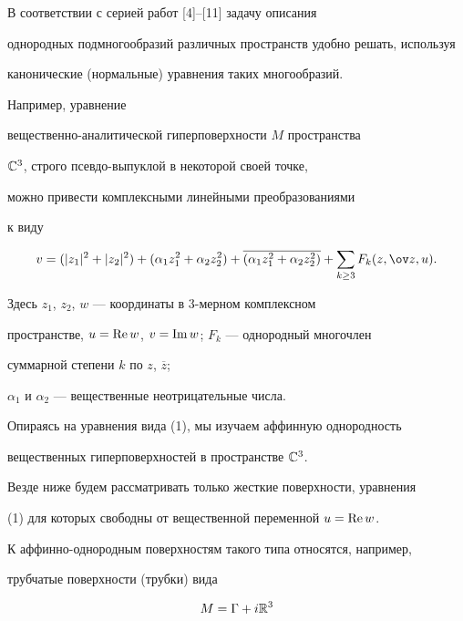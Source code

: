 В соответствии с серией работ [4]--[11] задачу описания 


однородных подмногообразий различных пространств удобно решать, используя


канонические (нормальные) уравнения таких многообразий. 


Например, уравнение 


вещественно-аналитической гиперповерхности $ M $ пространства 


$ \Bbb C^3 $, строго псевдо-выпуклой в некоторой своей точке,


можно привести комплексными линейными преобразованиями 


к виду 


\begin{equation}


v = ( | z_1 |^2 + |z_2 |^2 ) + ( \alpha_1 z_1^2 + \alpha_2 z_2^2 ) + 


\overline {( \alpha_1 z_1^2 + \alpha_2 z_2^2 ) } + 


\sum_{k \ge 3} F_k(z, \ov z, u ).


\end{equation}


Здесь $ z_1$, $z_2$, $w $ --- координаты в 3-мерном комплексном 


пространстве, $ u = \operatorname{Re} w$, $v = \operatorname{Im} w $; $ F_k $ --- однородный многочлен 


суммарной степени $ k $ по $ z$, $ \overline z $; 


$ \alpha_1 $ и $ \alpha_2 $ --- вещественные неотрицательные числа.





Опираясь на уравнения вида (1), мы изучаем аффинную однородность 


вещественных гиперповерхностей в пространстве $ \Bbb C^3 $.








Везде ниже будем рассматривать только жесткие поверхности, уравнения


(1) для которых свободны от вещественной переменной $ u = \operatorname{Re} w $. 


К аффинно-однородным поверхностям такого типа относятся, например, 


трубчатые поверхности (трубки) вида 


$$ 


M = \Gamma + i\Bbb R^3


$$


